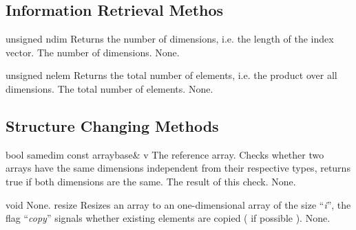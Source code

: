 \vspace*{10mm}

\subsection{Information Retrieval Methos}

\setConstInstance
\printEmptyMethodReturnSpecial
{unsigned}
{ndim}
{Returns the number of dimensions, i.e. the length of the index vector.}
{The number of dimensions.}
{None.}

\setConstInstance
\printEmptyMethodReturnSpecial
{unsigned}
{nelem}
{Returns the total number of elements, i.e. the product over all dimensions.}
{The total number of elements.}
{None.}

\clearpage

\subsection{Structure Changing Methods}

\setConstInstance
\printMethodWithOneParam
{bool}
{samedim}
{const arraybase\&}
{v}
{The reference array.}
{Checks whether two arrays have the same dimensions independent from
their respective types, returns true if both dimensions are the same.}
{The result of this check.}
{None.}

\setNormalInstance
\setCorrectWidthThree{8pt}
\printMethodWithParamsSaved
{void}
{None.}
{resize}
{Resizes an array to an one-dimensional array of the size ``{\em i}'', the
flag ``{\em copy}'' signals whether existing elements are copied ( if
possible ).}
{None.}
\setCorrectWidthThree{4pt}


